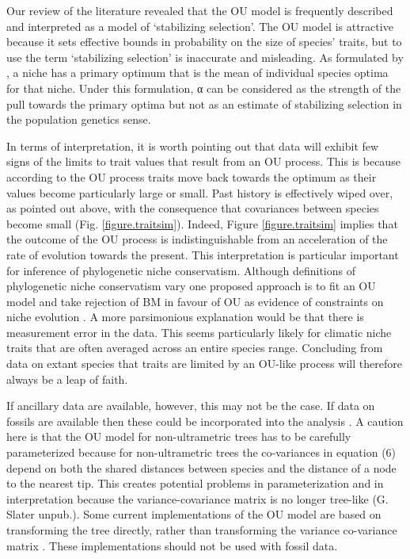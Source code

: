 \documentclass[a4paper,12pt]{article}
\begin{document}
Our review of the literature revealed that the OU model is frequently described and interpreted as a model of ‘stabilizing selection’. The OU model is attractive because it sets effective bounds in probability on the size of species’ traits, but to use the term ‘stabilizing selection’ is inaccurate and misleading. As formulated by \citet{hansen1997stabilizing}, a niche has a primary optimum that is the mean of individual species optima for that niche. Under this formulation, α can be considered as the strength of the pull towards the primary optima \citep{hansen2012adaptive} but not as an estimate of stabilizing selection in the population genetics sense. 

In terms of interpretation, it is worth pointing out that data will exhibit few signs of the limits to trait values that result from an OU process. This is because according to the OU process traits move back towards the optimum as their values become particularly large or small. Past history is effectively wiped over, as pointed out above, with the consequence that covariances between species become small (Fig. \ref{figure.traitsim}). Indeed, Figure \ref{figure.traitsim} implies that the outcome of the OU process is indistinguishable from an acceleration of the rate of evolution towards the present. This interpretation is particular important for inference of phylogenetic niche conservatism. Although definitions of phylogenetic niche conservatism vary \citep{Losos:2008aa,Losos:2008ab,Wiens:2008aa,crisp2012phylogenetic} one proposed approach is to fit an OU model and take rejection of BM in favour of OU as evidence of constraints on niche evolution \citep{Wiens:2010aa}. A more parsimonious explanation would be that there is measurement error in the data. This seems particularly likely for climatic niche traits that are often averaged across an entire species range. Concluding from data on extant species that traits are limited by an OU-like process will therefore always be a leap of faith. 

If ancillary data are available, however, this may not be the case. If data on fossils are available then these could be incorporated into the analysis \citep{Slater:2012ab}.  A caution here is that the OU model for non-ultrametric trees has to be carefully parameterized because for non-ultrametric trees the co-variances in equation (6) depend on both the shared distances between species and the distance of a node to the nearest tip. This creates potential problems in parameterization and in interpretation because the variance-covariance matrix is no longer tree-like (G. Slater unpub.). Some current implementations of the OU model are based on transforming the tree directly, rather than transforming the variance co-variance matrix \citep[e.g., MOTMOT;][]{Thomas:2011aa}. These implementations should not be used with fossil data.
\end{document}
